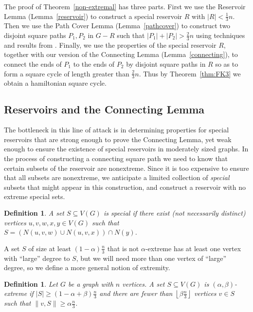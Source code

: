 \documentclass[oneside,12pt]{memoir}
\newtheorem{definition}[theorem]{Definition}
\newcommand{\floor}[1]{\left\lfloor#1\right\rfloor}
\begin{document}
The proof of Theorem~\ref{non-extremal} has three parts. First we
use the Reservoir Lemma (Lemma~\ref{reservoir}) to construct a special reservoir
$R$ with $|R|<\frac{1}{3}n$. Then we use the Path Cover Lemma (Lemma~\ref{pathcover}) to construct two disjoint square
paths $P_{1},P_{2}$ in $G-R$ such that $|P_{1}|+|P_{2}|>\frac{2}{3}n$
using techniques and results from \cite{FK1,FK2}. Finally, we use
the properties of the special reservoir $R$, together with our version
of the Connecting Lemma (Lemma~\ref{connecting}), to connect the ends of
$P_{1}$ to the ends of $P_{2}$ by disjoint square paths in $R$
so as to form a square cycle of length greater than $\frac{2}{3}n$.
Thus by Theorem~\ref{thm:FK3} we obtain a hamiltonian square cycle.


\subsection{Reservoirs and the Connecting Lemma}

The bottleneck in this line of attack is in determining properties for
special reservoirs that are strong enough to prove the Connecting
Lemma, yet weak enough to ensure the existence of special reservoirs
in moderately sized graphs. 
In the process of constructing a connecting square path we need to know that 
certain subsets of the reservoir are nonextreme. Since it is too expensive to ensure that all subsets are nonextreme,
we anticipate a limited collection of  \emph{special} subsets that might appear in this construction, and construct
 a reservoir with no extreme special sets.
\begin{definition}
\label{def:special}A set $S\subseteq V(G)$ is \emph{special} if there
exist (not necessarily distinct) vertices $u,v,w,x,y\in V(G)$ such that $S=(N(u,v,w)\cup N(u,v,x))\cap N(y)$.
\end{definition}

A set $S$ of size at least $(1-\alpha)\frac{n}{3}$ that is not $\alpha$-extreme has at least one vertex with ``large'' degree to $S$, but we will need more than one vertex of ``large'' degree, so we define a more general notion of extremity.

\begin{definition}\label{def:alpha-beta}
Let $G$ be a graph with $n$ vertices.  A set $S\subseteq V(G)$ is $(\alpha,\beta)$-\emph{extreme} if $|S|\geq (1-\alpha+\beta)\frac{n}{3}$ and there are fewer than $\floor{\beta\frac{n}{3}}$ vertices $v\in S$ such that $\|v,S\|\geq \alpha \frac{n}{3}$. 
\end{definition}
\end{document}
